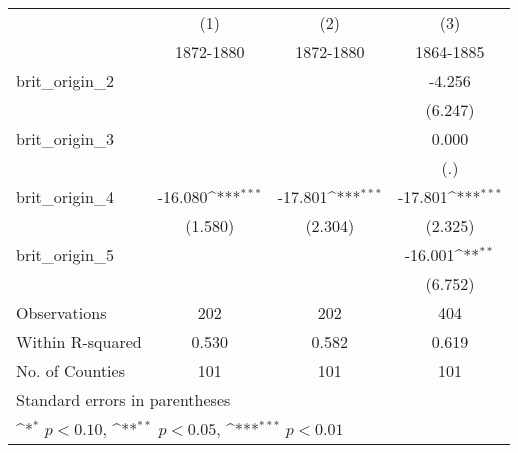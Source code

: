 {
\def\sym#1{\ifmmode^{#1}\else\(^{#1}\)\fi}
\begin{tabular}{l*{3}{c}}
\hline\hline
                    &\multicolumn{1}{c}{(1)}&\multicolumn{1}{c}{(2)}&\multicolumn{1}{c}{(3)}\\
                    &\multicolumn{1}{c}{1872-1880}&\multicolumn{1}{c}{1872-1880}&\multicolumn{1}{c}{1864-1885}\\
\hline
brit\_origin\_2       &                     &                     &      -4.256         \\
                    &                     &                     &     (6.247)         \\
[1em]
brit\_origin\_3       &                     &                     &       0.000         \\
                    &                     &                     &         (.)         \\
[1em]
brit\_origin\_4       &     -16.080\sym{***}&     -17.801\sym{***}&     -17.801\sym{***}\\
                    &     (1.580)         &     (2.304)         &     (2.325)         \\
[1em]
brit\_origin\_5       &                     &                     &     -16.001\sym{**} \\
                    &                     &                     &     (6.752)         \\
\hline
Observations        &         202         &         202         &         404         \\
Within R-squared    &       0.530         &       0.582         &       0.619         \\
No. of Counties     &         101         &         101         &         101         \\
\hline\hline
\multicolumn{4}{l}{\footnotesize Standard errors in parentheses}\\
\multicolumn{4}{l}{\footnotesize \sym{*} \(p<0.10\), \sym{**} \(p<0.05\), \sym{***} \(p<0.01\)}\\
\end{tabular}
}
